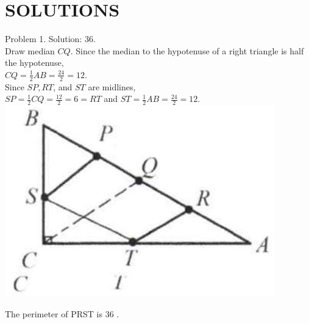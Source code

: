 \documentclass[10pt]{article}
\begin{document}
\section*{SOLUTIONS}
Problem 1. Solution: 36.\\
Draw median \(C Q\). Since the median to the hypotenuse of a right triangle is half the hypotenuse,\\
\(C Q=\frac{1}{2} A B=\frac{24}{2}=12\).\\
Since \(S P, R T\), and \(S T\) are midlines,\\
\(S P=\frac{1}{2} C Q=\frac{12}{2}=6=R T\) and \(S T=\frac{1}{2} A B=\frac{24}{2}=12\).\\
\includegraphics[max width=\textwidth, center]{2025_04_17_97bc1f7e44d93c271a88g-047(2)}

The perimeter of PRST is 36 .
\end{document}
